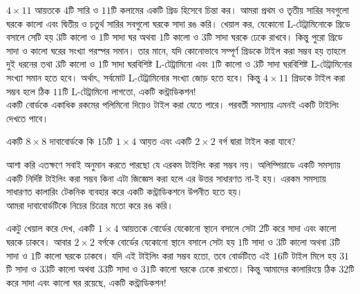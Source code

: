 \documentclass[11pt]{report}
\begin{document}
$4 \times 11$ আয়তকে $4$টি সারি ও $11$টি কলামের একটি গ্রিড হিসেবে চিন্তা কর। আমরা প্রথম ও তৃতীয় সারির সবগুলো ঘরকে কালো এবং দ্বিতীয় ও চতুর্থ সারির সবগুলো ঘরকে সাদা রঙ করি। খেয়াল কর, যেকোনো L-টেট্রামিনোকে গ্রিডে বসালে সেটি হয় $3$টি কালো ও $1$টি সাদা ঘর অথবা $1$টি কালো ও $3$টি সাদা ঘরকে ঢেকে রাখবে। কিন্তু পুরো গ্রিডে সাদা ও কালো ঘরের সংখ্যা পরস্পর সমান। তার মানে, যদি কোনোভাবে সম্পূর্ণ গ্রিডকে টাইল করা সম্ভব হয় তাহলে দুই ধরনের তথা $3$টি কালো ও $1$টি সাদা ঘরবিশিষ্ট L-টেট্রামিনো এবং $1$টি কালো ও $3$টি সাদা ঘরবিশিষ্ট L-টেট্রামিনোর সংখ্যা সমান হতে হবে। অর্থাৎ, সর্বমোট L-টেট্রামিনোর সংখ্যা জোড় হতে হবে। কিন্তু $4 \times 11$ গ্রিডকে টাইল করা সম্ভব হলে ঠিক $11$টি L-টেট্রামিনো লাগতো, একটি কন্ট্রাডিকশন!\\

একটি বোর্ডকে একাধিক রকমের পলিমিনো দিয়েও টাইল করা যেতে পারে। পরবর্তী সমস্যায় এমনই একটি টাইলিং দেখতে পাবে।\\

\begin{tcolorbox}[colframe=black!80!green,title=উদাহরণ 1.2.3]
একটি $8 \times 8$ দাবাবোর্ডকে কি $15$টি $1 \times 4$ আয়ত এবং একটি $2 \times 2$ বর্গ দ্বারা টাইল করা যাবে?
\end{tcolorbox}

আশা করি এতক্ষণে সবাই অনুমান করতে পারছো যে এরকম টাইলিং করা সম্ভব নয়। অলিম্পিয়াডে একটি সমস্যায় একটি নির্দিষ্ট টাইলিং করা সম্ভব কিনা এটা জিজ্ঞেস করা হলে এর উত্তর সাধারণত না-ই হয়। এরকম সমস্যায় সাধারণত কালারিং টেকনিক ব্যবহার করে একটি কন্ট্রাডিকশনে উপনীত হতে হয়।\\

আমরা দাবাবোর্ডটিকে নিচের চিত্রের মতো করে রঙ করি।

\begin{center}
\end{center}

একটু খেয়াল করে দেখ, একটি $1 \times 4$ আয়তকে বোর্ডের যেকোনো স্থানে বসালে সেটা $2$টি করে সাদা এবং কালো ঘরকে ঢাকবে। আবার $2 \times 2$ বর্গকে বোর্ডের যেকোনো স্থানে বসালে সেটা হয় $1$টি সাদা ও $3$টি কালো অথবা $3$টি সাদা ও $1$টি কালো ঘরকে ঢাকবে। যদি এই টাইলিং করা সম্ভব হতো, তবে বোর্ডটিতে এই $16$টি টাইল মিলে হয় $31$টি সাদা ও $33$টি কালো অথবা $33$টি সাদা ও $31$টি কালো ঘরকে ঢেকে রাখতো। কিন্তু আমাদের কালারিংয়ে ঠিক $32$টি করে সাদা এবং কালো ঘর রয়েছে, একটি কন্ট্রাডিকশন!\\
\end{document}
